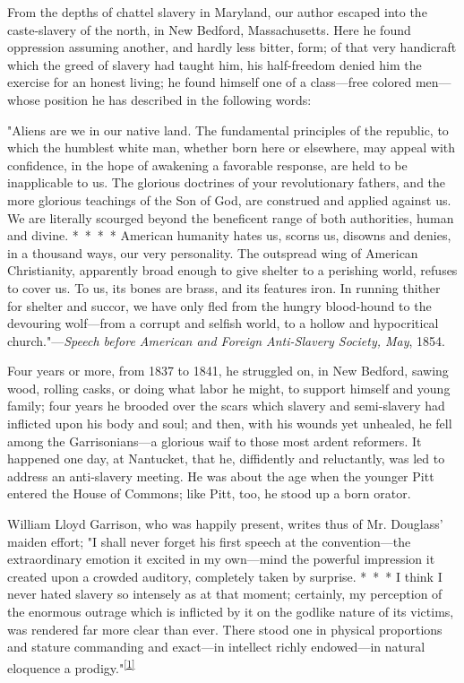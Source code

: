 From the depths of chattel slavery in Maryland, our author escaped into
the caste-slavery of the north, in New Bedford, Massachusetts. Here he
found oppression assuming another, and hardly less bitter, form; of that
very handicraft which the greed of slavery had taught him, his
half-freedom denied him the exercise for an honest living; he found
himself one of a class---free colored men---whose position he has
described in the following words:

"Aliens are we in our native land. The fundamental principles of the
republic, to which the humblest white man, whether born here or
elsewhere, may appeal with confidence, in the hope of {}awakening a
favorable response, are held to be inapplicable to us. The glorious
doctrines of your revolutionary fathers, and the more glorious teachings
of the Son of God, are construed and applied against us. We are
literally scourged beyond the beneficent range of both authorities,
human and divine. {*~*~*~*} American humanity hates us, scorns us,
disowns and denies, in a thousand ways, our very personality. The
outspread wing of American Christianity, apparently broad enough to give
shelter to a perishing world, refuses to cover us. To us, its bones are
brass, and its features iron. In running thither for shelter and succor,
we have only fled from the hungry blood-hound to the devouring
wolf---from a corrupt and selfish world, to a hollow and hypocritical
church."---\emph{Speech before American and Foreign Anti-Slavery
Society, May}, 1854.

Four years or more, from 1837 to 1841, he struggled on, in New Bedford,
sawing wood, rolling casks, or doing what labor he might, to support
himself and young family; four years he brooded over the scars which
slavery and semi-slavery had inflicted upon his body and soul; and then,
with his wounds yet unhealed, he fell among the Garrisonians---a
glorious waif to those most ardent reformers. It happened one day, at
Nantucket, that he, diffidently and reluctantly, was led to address an
anti-slavery meeting. He was about the age when the younger Pitt entered
the House of Commons; like Pitt, too, he stood up a born orator.

William Lloyd Garrison, who was happily present, writes thus of Mr.
Douglass' maiden effort; "I shall never forget his first speech at the
convention---the extraordinary emotion it excited in my own---mind the
powerful impression it created upon a crowded auditory, completely taken
by surprise. {*~*~*} I think I never hated slavery so intensely as at
that moment; certainly, my perception of the enormous outrage which is
inflicted by it on the godlike nature of its victims, was rendered far
more clear than ever. There stood one in physical proportions and
stature commanding and exact---in intellect richly endowed---in natural
eloquence a
prodigy."\textsuperscript{\protect\hyperlink{cite_note-1}{{[}1{]}}}

